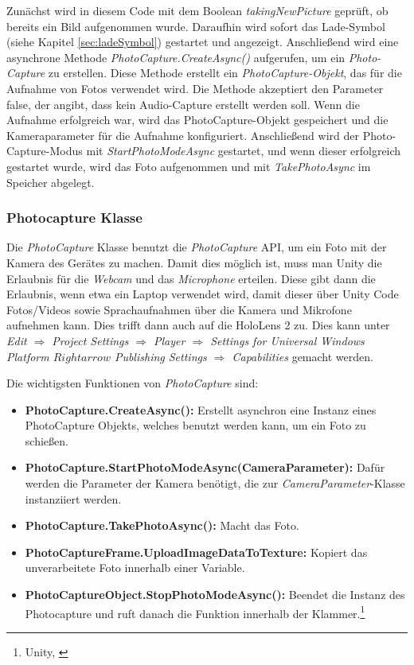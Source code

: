 Zunächst wird in diesem Code mit dem Boolean \textit{takingNewPicture} geprüft, ob bereits ein Bild aufgenommen wurde. Daraufhin wird sofort das Lade-Symbol (siehe Kapitel \ref{sec:ladeSymbol}) gestartet und angezeigt. Anschließend wird eine asynchrone Methode \textit{PhotoCapture.CreateAsync()} aufgerufen, um ein \textit{Photo-Capture} zu erstellen. Diese Methode erstellt ein \textit{PhotoCapture-Objekt}, das für die Aufnahme von Fotos verwendet wird. Die Methode akzeptiert den Parameter false, der angibt, dass kein Audio-Capture erstellt werden soll. Wenn die Aufnahme erfolgreich war, wird das PhotoCapture-Objekt gespeichert und die Kameraparameter für die Aufnahme konfiguriert. Anschließend wird der Photo-Capture-Modus mit \textit{StartPhotoModeAsync} gestartet, und wenn dieser erfolgreich gestartet wurde, wird das Foto aufgenommen und mit \textit{TakePhotoAsync} im Speicher abgelegt.

\subsubsection{\label{sec:Photocapture}Photocapture Klasse}
Die \textit{PhotoCapture} Klasse benutzt die \textit{PhotoCapture} API, um ein Foto mit der Kamera des Gerätes zu machen.
Damit dies möglich ist, muss man Unity die Erlaubnis für die \textit{Webcam} und das \textit{Microphone} erteilen. Diese gibt dann die Erlaubnis, wenn etwa ein Laptop verwendet wird, damit dieser über Unity Code Fotos/Videos sowie Sprachaufnahmen über die Kamera und Mikrofone aufnehmen kann. Dies trifft dann auch auf die HoloLens 2 zu.
Dies kann unter \textit{Edit $\Rightarrow$ Project Settings $\Rightarrow$ Player $\Rightarrow$ Settings for Universal Windows Platform $Rightarrow$ Publishing Settings $\Rightarrow$ Capabilities} gemacht werden.

Die wichtigsten Funktionen von \textit{PhotoCapture} sind:


\begin{itemize}
    \item \textbf{PhotoCapture.CreateAsync():} Erstellt asynchron eine Instanz eines PhotoCapture Objekts, welches benutzt werden kann, um ein Foto zu schießen.
    \item \textbf{PhotoCapture.StartPhotoModeAsync(CameraParameter):} Dafür werden die Parameter der Kamera benötigt, die zur \textit{CameraParameter}-Klasse instanziiert werden.
    \item \textbf{PhotoCapture.TakePhotoAsync():} Macht das Foto.
    \item \textbf{PhotoCaptureFrame.UploadImageDataToTexture:} Kopiert das unverarbeitete Foto innerhalb einer Variable.
    \item \textbf{PhotoCaptureObject.StopPhotoModeAsync():} Beendet die Instanz des Photocapture und ruft danach die Funktion innerhalb der Klammer.\footnote{Unity, \cite{Photocapture}}
\end{itemize}


